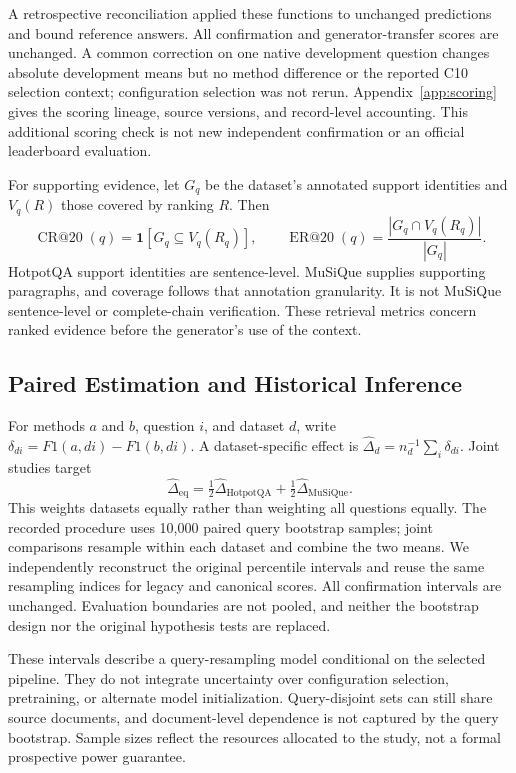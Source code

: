 \documentclass[11pt,a4paper]{article}
\begin{document}
A retrospective reconciliation applied these functions to unchanged
predictions and bound reference answers. All confirmation and
generator-transfer scores are unchanged. A common correction on one native
development question changes absolute development means but no method
difference or the reported C10 selection context; configuration selection was
not rerun. Appendix~\ref{app:scoring} gives the scoring lineage, source
versions, and record-level accounting. This additional scoring check is not
new independent confirmation or an official leaderboard evaluation.

For supporting evidence, let $G_q$ be the dataset's annotated support
identities and $V_q(R)$ those covered by ranking $R$. Then
\begin{equation}
\operatorname{CR@20}(q)=\mathbf{1}[G_q\subseteq V_q(R_q)],\qquad
\operatorname{ER@20}(q)=\frac{|G_q\cap V_q(R_q)|}{|G_q|}.
\end{equation}
HotpotQA support identities are sentence-level. MuSiQue supplies supporting
paragraphs, and coverage follows that annotation granularity. It is not
MuSiQue sentence-level or complete-chain verification. These retrieval
metrics concern ranked evidence before the generator's use of the context.

\subsection{Paired Estimation and Historical Inference}
For methods $a$ and $b$, question $i$, and dataset $d$, write
$\delta_{di}=F1(a,di)-F1(b,di)$. A dataset-specific effect is
$\hat\Delta_d=n_d^{-1}\sum_i\delta_{di}$. Joint studies target
\begin{equation}
\hat\Delta_{\mathrm{eq}}=\tfrac12\hat\Delta_{\mathrm{HotpotQA}}
                       +\tfrac12\hat\Delta_{\mathrm{MuSiQue}}.
\end{equation}
This weights datasets equally rather than weighting all questions equally.
The recorded procedure uses 10,000 paired query bootstrap samples; joint
comparisons resample within each dataset and combine the two means. We
independently reconstruct the original percentile intervals and reuse the same
resampling indices for legacy and canonical scores. All confirmation
intervals are unchanged. Evaluation boundaries are not pooled, and neither
the bootstrap design nor the original hypothesis tests are replaced.

These intervals describe a query-resampling model conditional on the selected
pipeline. They do not integrate uncertainty over configuration selection,
pretraining, or alternate model initialization. Query-disjoint sets can still
share source documents, and document-level dependence is not captured by the
query bootstrap. Sample sizes reflect the resources allocated to the study,
not a formal prospective power guarantee.
\end{document}
